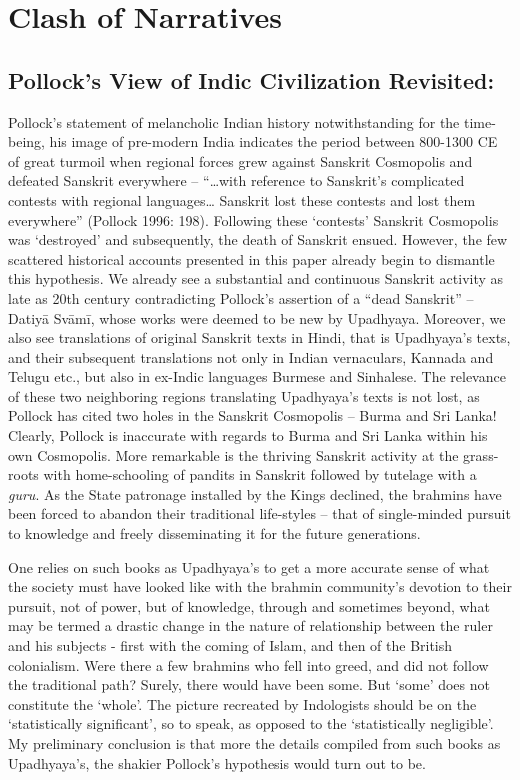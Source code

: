 \section*{Clash of Narratives}

\subsection*{Pollock’s View of Indic Civilization Revisited:}

Pollock’s statement of melancholic Indian history notwithstanding for the time-being, his image of pre-modern India indicates the period between 800-1300 CE of great turmoil when regional forces grew against Sanskrit Cosmopolis and defeated Sanskrit everywhere – “…with reference to Sanskrit’s complicated contests with regional languages… Sanskrit lost these contests and lost them everywhere” (Pollock 1996: 198). Following these ‘contests’ Sanskrit Cosmopolis was ‘destroyed’ and subsequently, the death of Sanskrit ensued. However, the few scattered historical accounts presented in this paper already begin to dismantle this hypothesis. We already see a substantial and continuous Sanskrit activity as late as 20th century contradicting Pollock’s assertion of a “dead Sanskrit” – Datiyā Svāmī, whose works were deemed to be new by Upadhyaya. Moreover, we also see translations of original Sanskrit texts in Hindi, that is Upadhyaya’s texts, and their subsequent translations not only in Indian vernaculars, Kannada and Telugu etc., but also in ex-Indic languages Burmese and Sinhalese. The relevance of these two neighboring regions translating Upadhyaya’s texts is not lost, as Pollock has cited two holes in the Sanskrit Cosmopolis – Burma and Sri Lanka! Clearly, Pollock is inaccurate with regards to Burma and Sri Lanka within his own Cosmopolis. More remarkable is the thriving Sanskrit activity at the grass-roots with home-schooling of pandits in Sanskrit followed by tutelage with a \textit{guru}. As the State patronage installed by the Kings declined, the brahmins have been forced to abandon their traditional life-styles – that of single-minded pursuit to knowledge and freely disseminating it for the future generations.

One relies on such books as Upadhyaya’s to get a more accurate sense of what the society must have looked like with the brahmin community’s devotion to their pursuit, not of power, but of knowledge, through and sometimes beyond, what may be termed a drastic change in the nature of relationship between the ruler and his subjects - first with the coming of Islam, and then of the British colonialism. Were there a few brahmins who fell into greed, and did not follow the traditional path? Surely, there would have been some. But ‘some’ does not constitute the ‘whole’. The picture recreated by Indologists should be on the ‘statistically significant’, so to speak, as opposed to the ‘statistically negligible’. My preliminary conclusion is that more the details compiled from such books as Upadhyaya’s, the shakier Pollock’s hypothesis would turn out to be.



